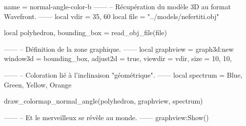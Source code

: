 \documentclass{standalone}
\begin{document}
\begin{luadraw}{name = normal-angle-color-b}
------
-- Récupération du modèle 3D au format Wavefront.
------
local vdir = {35, 60}
local file = "../models/nefertiti.obj"

local polyhedron, bounding_box = read_obj_file(file)

------
-- Définition de la zone graphique.
------
local graphview = graph3d:new{
  window3d = bounding_box,
  adjust2d = true,
  viewdir  = vdir,
  size     = {10, 10},
}

------
-- Coloration lié à l'inclinaison "géométrique".
------
local spectrum = {Blue, Green, Yellow, Orange}

draw_colormap_normal_angle(polyhedron, graphview, spectrum)

------
-- Et le merveilleux se révèle au monde.
------
graphview:Show()
\end{luadraw}
\end{document}
